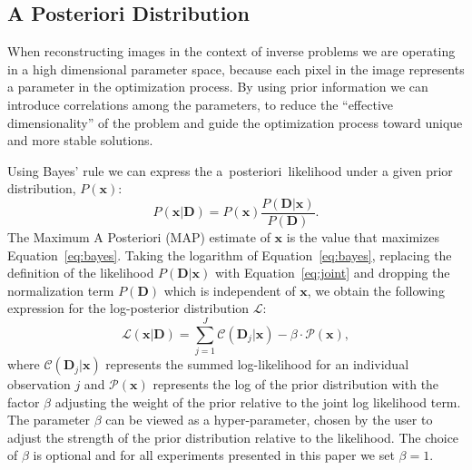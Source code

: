 \documentclass[twocolumn, linenumbers]{aastex631}
\newcommand{\aposteriori}{a~posteriori~}
\begin{document}
    \subsection{A Posteriori Distribution}
    When reconstructing images in the context of inverse problems we are operating in a high dimensional parameter space, because each pixel in the image represents a parameter in the optimization process. By using prior information we can introduce correlations among the parameters, to reduce the \enquote{effective dimensionality} of the problem and guide the optimization process toward unique and more stable solutions.
    
    Using Bayes' rule we can express the \aposteriori likelihood under a given prior distribution, $P(\mathbf{x} )$:
    \begin{equation}
        \label{eq:bayes}
        P(\mathbf{x}|\textbf{D}) = P(\mathbf{x} ) \frac{P(\textbf{D} |\mathbf{x})}{P(\textbf{D})}.
    \end{equation}
    The Maximum A Posteriori (MAP) estimate of $\mathbf{x}$ is the value that maximizes Equation~\ref{eq:bayes}.
    Taking the logarithm of Equation~\ref{eq:bayes}, replacing the definition of the likelihood $P(\mathbf{D}|\mathbf{x})$ with Equation~\ref{eq:joint} and dropping the normalization term $P(\mathbf{D})$ which is independent of $\mathbf{x}$, we obtain the following expression for the log-posterior distribution
    $\mathcal{L}$:
    \begin{equation}
        \label{eq:total}
        \mathcal{L}\left(\mathbf{x} | \mathbf{D} \right) = \sum_{j=1}^J \mathcal{C}\left( \mathbf{D}_j | \mathbf{x} \right) - \beta \cdot \mathcal{P}(\mathbf{x}),
    \end{equation}
    where $\mathcal{C}\left( \mathbf{D}_j | \mathbf{x} \right)$ represents the summed log-likelihood for an individual observation $j$ and $\mathcal{P}(\mathbf{x})$ represents the log of the prior distribution with the factor $\beta$ adjusting the weight of the prior relative to the joint log likelihood term. The parameter $\beta$ can be viewed as a hyper-parameter, chosen by the user to adjust the strength of the prior distribution relative to the likelihood. The choice of $\beta$ is optional and for all experiments presented in this paper we set $\beta=1$. 

\end{document}
